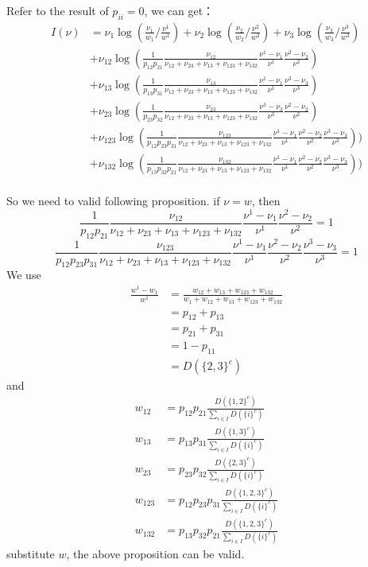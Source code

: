 \documentclass[a4paper,11pt]{article}
\begin{document}
Refer to the result of $p_{ii}=0$, we can get：
\begin{align*}
    I(\nu)
    &= 
    \nu_1 \log(\frac{\nu_1}{w_1} / \frac{\nu^1}{w^1})
    + \nu_2 \log(\frac{\nu_2}{w_2} / \frac{\nu^2}{w^2})
    + \nu_3 \log(\frac{\nu_3}{w_3} / \frac{\nu^3}{w^3}) \\
    &+\nu_{12} \log(\frac{1}{p_{12}p_{21}} \frac{\nu_{12}}{\nu_{12}+\nu_{23}+\nu_{13}+\nu_{123}+\nu_{132}} 
    \frac{\nu^{1}-\nu_{1}}{\nu^{1}}\frac{\nu^{2}-\nu_{2}}{\nu^{2}}) \\
    &+ \nu_{13} \log(\frac{1}{p_{13}p_{31}} \frac{\nu_{13}}{\nu_{12}+\nu_{23}+\nu_{13}+\nu_{123}+\nu_{132}}
    \frac{\nu^{1}-\nu_{1}}{\nu^{1}}\frac{\nu^{3}-\nu_{3}}{\nu^{3}}) \\
    &+ \nu_{23} \log(\frac{1}{p_{23}p_{32}} \frac{\nu_{23}}{\nu_{12}+\nu_{23}+\nu_{13}+\nu_{123}+\nu_{132}} 
    \frac{\nu^{3}-\nu_{3}}{\nu^{3}}\frac{\nu^{2}-\nu_{2}}{\nu^{2}}) \\
    &+ \nu_{123} \log(\frac{1}{p_{12}p_{23}p_{31}} \frac{\nu_{123}}{\nu_{12}+\nu_{23}+\nu_{13}+\nu_{123}+\nu_{132}}
    \frac{\nu^{1}-\nu_{1}}{\nu^{1}}\frac{\nu^{2}-\nu_{2}}{\nu^{2}} \frac{\nu^{3}-\nu_{3}}{\nu^{3}})) \\
    &+ \nu_{132} \log(\frac{1}{p_{13}p_{32}p_{21}} \frac{\nu_{132}}{\nu_{12}+\nu_{23}+\nu_{13}+\nu_{123}+\nu_{132}}
    \frac{\nu^{1}-\nu_{1}}{\nu^{1}}\frac{\nu^{2}-\nu_{2}}{\nu^{2}} \frac{\nu^{3}-\nu_{3}}{\nu^{3}})) \\
\end{align*}

So we need to valid following proposition. if $\nu=w$, then
$$
\frac{1}{p_{12}p_{21}} \frac{\nu_{12}}{\nu_{12}+\nu_{23}+\nu_{13}+\nu_{123}+\nu_{132}} \frac{\nu^{1}-\nu_{1}}{\nu^{1}}\frac{\nu^{2}-\nu_{2}}{\nu^{2}} = 1
$$
$$
\frac{1}{p_{12}p_{23}p_{31}} \frac{\nu_{123}}{\nu_{12}+\nu_{23}+\nu_{13}+\nu_{123}+\nu_{132}}\frac{\nu^{1}-\nu_{1}}{\nu^{1}}\frac{\nu^{2}-\nu_{2}}{\nu^{2}} \frac{\nu^{3}-\nu_{3}}{\nu^{3}} = 1
$$
We use
\begin{align*}
    \frac{w^{1}-w_{1}}{w^{1}} &= \frac{w_{12}+w_{13}+w_{123}+w_{132}}{w_{1}+w_{12}+w_{13}+w_{123}+w_{132}} \\
    &= p_{12}+p_{13} \\
    &= p_{21}+p_{31} \\
    &= 1 - p_{11} \\
    &= D(\{2, 3\}^c)
\end{align*}
and
\begin{align*}
    w_{12} &= p_{12}p_{21} \frac{D(\{1, 2\}^c)}{\sum_{i\in I} D(\{i\}^c)} \\
    w_{13} &= p_{13}p_{31} \frac{D(\{1, 3\}^c)}{\sum_{i\in I} D(\{i\}^c)} \\
    w_{23} &= p_{23}p_{32} \frac{D(\{2, 3\}^c)}{\sum_{i\in I} D(\{i\}^c)} \\
    w_{123} &= p_{12}p_{23}p_{31} \frac{D(\{1, 2, 3\}^c)}{\sum_{i\in I} D(\{i\}^c)} \\
    w_{132} &= p_{13}p_{32}p_{21} \frac{D(\{1, 2, 3\}^c)}{\sum_{i\in I} D(\{i\}^c)}
\end{align*}
substitute $w$, the above proposition can be valid.
\end{document}
